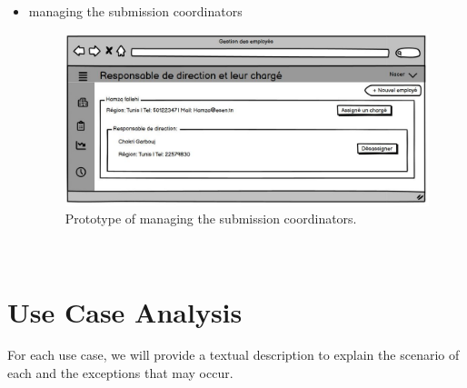 \clearpage
\begin{itemize}
    \item managing the submission coordinators\begin{figure}[h!]
    \centering
    \includegraphics[width=1\textwidth]{figures/ges emp2.JPG}
    \caption{Prototype of managing the submission coordinators.}
\end{figure}\
\end{itemize}



\clearpage

\section{Use Case Analysis}
For each use case, we will provide a textual description to explain the scenario of each and the exceptions that may occur.
